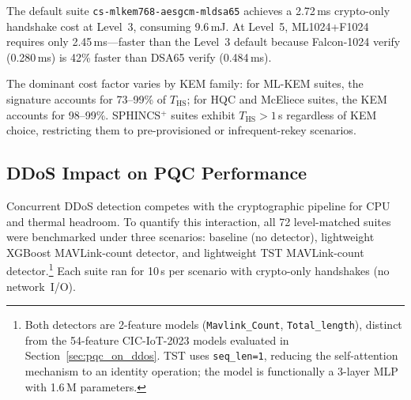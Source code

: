 The default suite \texttt{cs-mlkem768-aesgcm-mldsa65} achieves a
2.72\,ms crypto-only handshake cost at Level~3, consuming 9.6\,mJ.
At Level~5, ML1024+F1024 requires only 2.45\,ms—faster than the
Level~3 default because Falcon-1024 verify (0.280\,ms) is 42\%
faster than DSA65 verify (0.484\,ms).

The dominant cost factor varies by KEM family: for ML-KEM suites,
the signature accounts for 73--99\% of $T_\text{HS}$; for HQC and
McEliece suites, the KEM accounts for 98--99\%.  SPHINCS$^+$ suites
exhibit $T_\text{HS} > 1$\,s regardless of KEM choice, restricting them
to pre-provisioned or infrequent-rekey scenarios.

\subsection{DDoS Impact on PQC Performance}
\label{sec:ddos_on_pqc}

Concurrent DDoS detection competes with the cryptographic pipeline for
CPU and thermal headroom.  To quantify this interaction, all 72
level-matched suites were benchmarked under three scenarios: baseline
(no detector), lightweight XGBoost MAVLink-count detector, and
lightweight TST MAVLink-count detector.\footnote{Both detectors are
2-feature models (\texttt{Mavlink\_Count}, \texttt{Total\_length}),
distinct from the 54-feature CIC-IoT-2023 models evaluated in
Section~\ref{sec:pqc_on_ddos}.  TST uses \texttt{seq\_len=1},
reducing the self-attention mechanism to an identity operation; the
model is functionally a 3-layer MLP with 1.6\,M parameters.}
Each suite ran for 10\,s per scenario with crypto-only handshakes
(no network~I/O).

